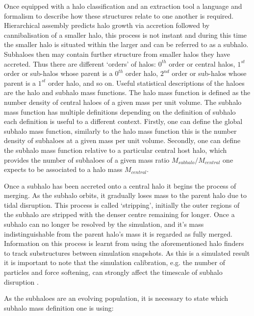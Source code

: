 Once equipped with a halo classification and an extraction tool a language and formalism to describe how these structures relate to one another is required. Hierarchical assembly predicts halo growth via accretion followed by cannibalisation of a smaller halo, this process is not instant and during this time the smaller halo is situated within the larger and can be referred to as a subhalo. Subhaloes then may contain further structure from smaller halos they have accreted. Thus there are different `orders' of halos: $0^{th}$ order or central halos, $1^{st}$ order or sub-halos whose parent is a $0^{th}$ order halo, $2^{nd}$ order or sub-halos whose parent is a $1^{st}$ order halo, and so on. Useful statistical descriptions of the haloes are the halo and subhalo mass functions. The halo mass function is defined as the number density of central haloes of a given mass per unit volume. The subhalo mass function has multiple definitions depending on the definition of subhalo each definition is useful to a different context. Firstly, one can define the global subhalo mass function, similarly to the halo mass function this is the number density of subhaloes at a given mass per unit volume. Secondly, one can define the subhalo mass function relative to a particular central host halo, which provides the number of subhaloes of a given mass ratio $M_{subhalo}/M_{central}$ one expects to be associated to a halo mass $M_{central}$. 


Once a subhalo has been accreted onto a central halo it begins the process of merging. As the subhalo orbits, it gradually loses mass to the parent halo due to tidal disruption. This process is called `stripping', initially the outer regions of the subhalo are stripped with the denser centre remaining for longer. Once a subhalo can no longer be resolved by the simulation, and it's mass indistinguishable from the parent halo's mass it is regarded as fully merged. Information on this process is learnt from using the aforementioned halo finders to track substructures between simulation snapshots. As this is a simulated result it is important to note that the simulation calibration, e.g. the number of particles and force softening, can strongly affect the timescale of subhalo disruption \cite{vandenBosch2018DarkDisruption}.

As the subhaloes are an evolving population, it is necessary to state which subhalo mass definition one is using:

